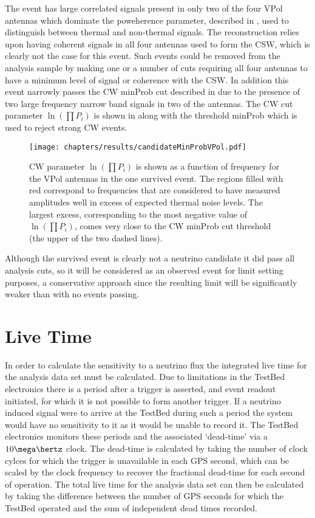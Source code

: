 The event has large correlated signals present in only two of the four VPol antennas which dominate the poweherence parameter, described in , used to distinguish between thermal and non-thermal signals. The reconstruction relies upon having coherent signals in all four antennas used to form the CSW, which is clearly not the case for this event. Such events could be removed from the analysis sample by making one or a number of cuts requiring all four antennas to have a minimum level of signal or coherence with the CSW. In addition this event narrowly passes the CW minProb cut described in  due to the presence of two large frequency narrow band signals in two of the antennas. The CW cut parameter $\ln (\prod P_{i})$ is shown in  along with the threshold minProb which is used to reject strong CW events.


\begin{figure}
  \texttt{[image: chapters/results/candidateMinProbVPol.pdf]}
  \caption{CW parameter $\ln (\prod P_{i})$ is shown as a function of frequency for the VPol antennas in the one survived event. The regions filled with red correspond to frequencies that are considered to have measured amplitudes well in excess of expected thermal noise levels. The largest excess, corresponding to the most negative value of $\ln (\prod P_{i})$, comes very close to the CW minProb cut threshold (the upper of the two dashed lines).}
  \label{fig:Results:minProb}
\end{figure}


Although the survived event is clearly not a neutrino candidate it did pass all analysis cuts, so it will be considered as an observed event for limit setting purposes, a conservative approach since the resulting limit will be significantly weaker than with no events passing. 


\section{Live Time}
\label{sec:Results:Live-Time}

In order to calculate the sensitivity to a neutrino flux the integrated live time for the analysis data set must be calculated. Due to limitations in the TestBed electronics there is a period after a trigger is asserted, and event readout initiated, for which it is not possible to form another trigger. If a neutrino induced signal were to arrive at the TestBed during such a period the system would have no sensitivity to it as it would be unable to record it. The TestBed electronics monitors these periods and the associated `dead-time' via a $10 \mega \hertz$ clock. The dead-time is calculated by taking the number of clock cylces for which the trigger is unavailable in each GPS second, which can be scaled by the clock frequency to recover the fractional dead-time for each second of operation. The total live time for the analysis data set can then be calculated by taking the difference between the number of GPS seconds for which the TestBed operated and the sum of independent dead times recorded. 

